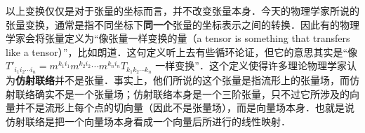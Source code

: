 以上变换仅仅是对于张量的坐标而言，并不改变张量本身．今天的物理学家所说的张量变换，通常是指不同坐标下\textbf{同一个}张量的坐标表示之间的转换．因此有的物理学家会将张量定义为“像张量一样变换的量（a tensor is something that transfers like a tensor）”，比如朗道．这句定义听上去有些循环论证，但它的意思其实是“像 $T'_{i_1i_2\cdots i_n}=m^{k_1i_1}m^{k_2i_2}\cdots m^{k_ni_n}T_{k_1k_2\cdots k_n}$ 一样变换”．这个定义使得许多理论物理学家认为\textbf{仿射联络}并不是张量．事实上，他们所说的这个张量是指流形上的张量场，而仿射联络确实不是一个张量场；仿射联络本身是一个三阶张量，只不过它所涉及的向量并不是流形上每个点的切向量（因此不是张量场），而是向量场本身．也就是说仿射联络是把一个向量场本身看成一个向量后所进行的线性映射．







